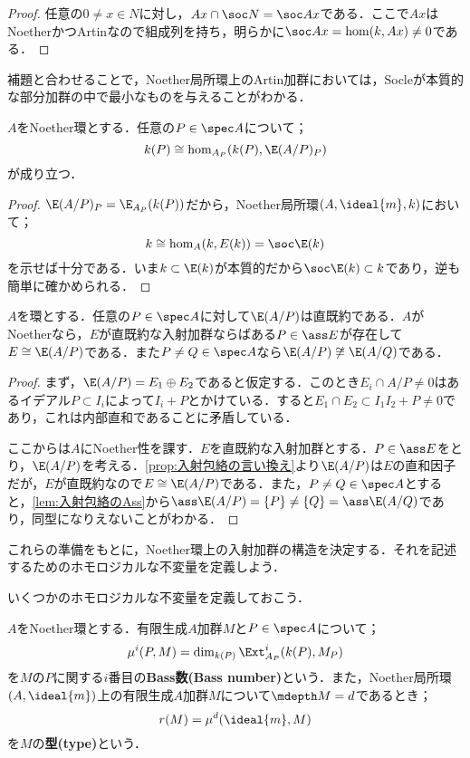 \begin{proof}
	任意の$0\neq x\in N$に対し，$Ax\cap\soc N=\soc Ax$である．ここで$Ax$はNoetherかつArtinなので組成列を持ち，明らかに$\soc Ax=\hom(k,Ax)\neq0$である．
\end{proof}

補題と合わせることで，Noether局所環上のArtin加群においては，Socleが本質的な部分加群の中で最小なものを与えることがわかる．

\begin{lem}\label{lem:k(P)とHom}
	$A$をNoether環とする．任意の$P\in\spec A$について；
	\[k(P)\cong\hom_{A_P}(k(P),\E(A/P)_P)\]
	が成り立つ．
\end{lem}

\begin{proof}
	$\E(A/P)_P=\E_{A_P}(k(P))$だから，Noether局所環$(A,\ideal{m},k)$において；
	\[k\cong\hom_A(k,E(k))=\soc \E(k)\]
	を示せば十分である．いま$k\subset \E(k)$が本質的だから$\soc \E(k)\subset k$であり，逆も簡単に確かめられる．
\end{proof}

\begin{prop}
	$A$を環とする．任意の$P\in\spec A$に対して$\E(A/P)$は直既約である．$A$がNoetherなら，$E$が直既約な入射加群ならばある$P\in\ass E$が存在して$E\cong\E(A/P)$である．また$P\neq Q\in\spec A$なら$\E(A/P)\not\cong\E(A/Q)$である．
\end{prop}

\begin{proof}
	まず，$\E(A/P)=E_1\oplus E_2$であると仮定する．このとき$E_i\cap A/P\neq 0$はあるイデアル$P\subset I_i$によって$I_i+P$とかけている．すると$E_1\cap E_2\subset I_1I_2+P\neq0$であり，これは内部直和であることに矛盾している．
	
	ここからは$A$にNoether性を課す．$E$を直既約な入射加群とする．$P\in\ass E$をとり，$\E(A/P)$を考える．\ref{prop:入射包絡の言い換え}より$\E(A/P)$は$E$の直和因子だが，$E$が直既約なので$E\cong\E(A/P)$である．また，$P\neq Q\in\spec A$とすると，\ref{lem:入射包絡のAss}から$\ass\E(A/P)=\{P\}\neq\{Q\}=\ass\E(A/Q)$であり，同型になりえないことがわかる．
\end{proof}

これらの準備をもとに，Noether環上の入射加群の構造を決定する．それを記述するためのホモロジカルな不変量を定義しよう．

いくつかのホモロジカルな不変量を定義しておこう．

\begin{defi}[Bass数，型]
	$A$をNoether環とする．有限生成$A$加群$M$と$P\in\spec A$について；
	\[\mu^i(P,M)=\dim_{k(P)}\Ext^i_{A_P}(k(P),M_P)\]
	を$M$の$P$に関する$i$番目の\textbf{Bass数(Bass number)}という．また，Noether局所環$(A,\ideal{m})$上の有限生成$A$加群$M$について$\mdepth M=d$であるとき；
	\[r(M)=\mu^d(\ideal{m},M)\]
	を$M$の\textbf{型(type)}という．
\end{defi}

